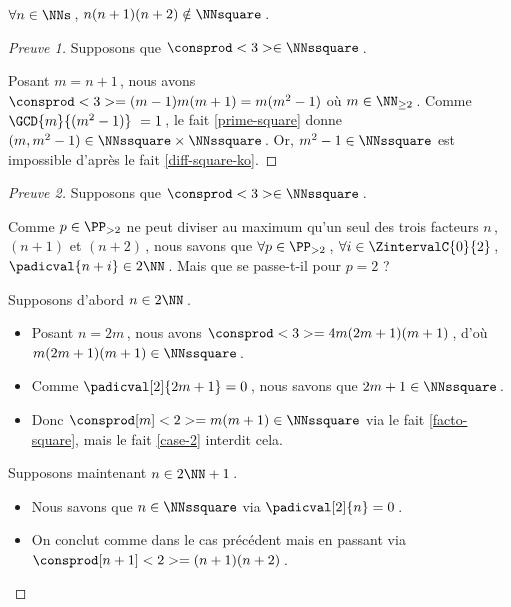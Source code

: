 \begin{fact} \label{case-3}
	 $\forall n \in \NNs$\,, $n(n+1)(n+2) \notin \NNsquare$\,.
\end{fact}




\begin{proof}[Preuve 1]
    Supposons que $\consprod<3> \in \NNssquare$\,.

    \smallskip
    
    Posant $m = n+1$\,, nous avons $\consprod<3> = (m-1)m(m+1) = m(m^2 - 1)$ où $m \in \NN_{\geq 2}$\,.
    Comme $\GCD{m}{(m^2 - 1)} = 1$\,, le fait \ref{prime-square} donne $(m, m^2 - 1) \in \NNssquare \times \NNssquare$\,.
    Or, $m^2 - 1 \in \NNssquare$ est impossible d'après le fait \ref{diff-square-ko}.
\end{proof}




\begin{proof}[Preuve 2]
    Supposons que $\consprod<3> \in \NNssquare$\,.

    \smallskip
    
    Comme $p \in \PP_{>2}$ ne peut diviser au maximum qu'un seul des trois facteurs $n$\,, $(n+1)$ et $(n+2)$\,, nous savons que 
    $\forall p \in \PP_{>2}$\,, 
    $\forall i \in \ZintervalC{0}{2}$\,, 
    $\padicval{n + i} \in 2 \NN$\,.
    Mais que se passe-t-il pour $p = 2$ ?
    
    \medskip
    
    Supposons d'abord $n \in 2 \NN$\,.
	\begin{itemize}
		\item Posant $n = 2 m$\,, nous avons $\consprod<3> = 4 m(2m+1)(m+1)$\,, d'où $m(2m+1)(m+1) \in \NNssquare$\,.
		
		\item Comme $\padicval[2]{2m+1} = 0$\,, nous savons que $2m+1 \in \NNssquare$\,.
		
		\item Donc $\consprod[m]<2> = m(m+1)\in \NNssquare$ via le fait \ref{facto-square}, mais le fait \ref{case-2} interdit cela.
	\end{itemize}
    
    \medskip
    
    Supposons maintenant $n \in 2 \NN + 1$\,.
	\begin{itemize}
		\item Nous savons que $n \in \NNssquare$ via $\padicval[2]{n} = 0$\,.

		\item On conclut comme dans le cas précédent mais en passant via $\consprod[n+1]<2>=(n+1)(n+2)$\,. \qedhere
	\end{itemize}
\end{proof}